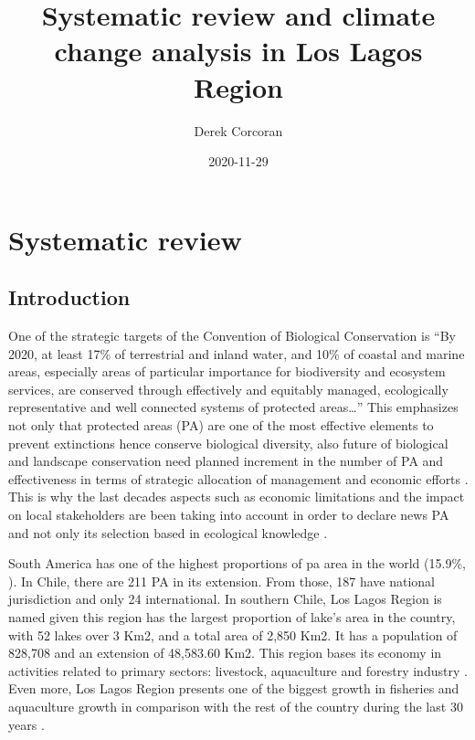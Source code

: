 \documentclass[]{article}
\title{Systematic review and climate change analysis in Los Lagos Region}
\author{Derek Corcoran}
\date{2020-11-29}
\begin{document}
\maketitle

\hypertarget{systematic-review}{%
\section{Systematic review}\label{systematic-review}}

\hypertarget{introduction}{%
\subsection{Introduction}\label{introduction}}

One of the strategic targets of the Convention of Biological Conservation is ``By 2020, at least 17\% of terrestrial and inland water, and 10\% of coastal and marine areas, especially areas of particular importance for biodiversity and ecosystem services, are conserved through effectively and equitably managed, ecologically representative and well connected systems of protected areas\ldots{}''
This emphasizes not only that protected areas (PA) are one of the most effective elements to prevent extinctions hence conserve biological diversity, also future of biological and landscape conservation need planned increment in the number of PA and effectiveness in terms of strategic allocation of management and economic efforts \citep{le2013protected, watson2014performance}.
This is why the last decades aspects such as economic limitations and the impact on local stakeholders are been taking into account in order to declare news PA and not only its selection based in ecological knowledge \citep{borrini2004indigenous}.

South America has one of the highest proportions of pa area in the world (15.9\%, \citet{ProtectedAreas}).
In Chile, there are 211 PA in its extension. From those, 187 have national jurisdiction and only 24 international.
In southern Chile, Los Lagos Region is named given this region has the largest proportion of lake's area in the country, with 52 lakes over 3 Km2, and a total area of 2,850 Km2. It has a population of 828,708 \citep{Censo2017} and an extension of 48,583.60 Km2.
This region bases its economy in activities related to primary sectors: livestock, aquaculture and forestry industry \citep{BNC_LosLagos}. Even more, Los Lagos Region presents one of the biggest growth in fisheries and aquaculture growth in comparison with the rest of the country during the last 30 years \citep{Soto-alvaradoDesarrollo}.
\end{document}

